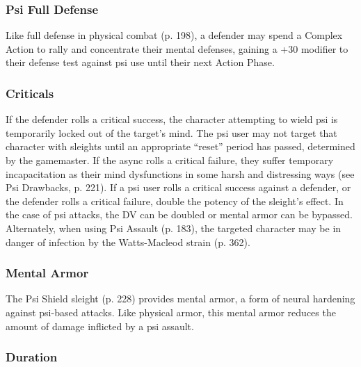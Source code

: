 \subsubsection{Psi Full Defense}

Like full defense in physical combat (p. 198), a defender
may spend a Complex Action to rally and concentrate
their mental defenses, gaining a +30 modifier
to their defense test against psi use until their next
Action Phase.

\subsubsection{Criticals}

If the defender rolls a critical success, the character
attempting to wield psi is temporarily locked out of
the target’s mind. The psi user may not target that
character with sleights until an appropriate “reset”
period has passed, determined by the gamemaster.
If the async rolls a critical failure, they suffer temporary
incapacitation as their mind dysfunctions in some
harsh and distressing ways (see Psi Drawbacks, p. 221).
If a psi user rolls a critical success against a defender,
or the defender rolls a critical failure, double
the potency of the sleight’s effect. In the case of psi attacks,
the DV can be doubled or mental armor can be
bypassed. Alternately, when using Psi Assault (p. 183),
the targeted character may be in danger of infection
by the Watts-Macleod strain (p. 362).

\subsubsection{Mental Armor}

The Psi Shield sleight (p. 228) provides mental armor,
a form of neural hardening against psi-based attacks.
Like physical armor, this mental armor reduces the
amount of damage inflicted by a psi assault.

\subsubsection{Duration}


